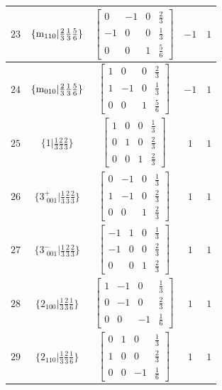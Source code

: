\documentclass[fleqn,8pt]{jsarticle}
\begin{document}
\begin{longtable}{ccccc}
$ 23 $ & $ \{{\rm m}_{110}|\frac{2}{3} \frac{1}{3} \frac{5}{6}\} $ & $ \begin{bmatrix} 0 & -1 & 0 & \frac{2}{3} \\ -1 & 0 & 0 & \frac{1}{3} \\ 0 & 0 & 1 & \frac{5}{6} \end{bmatrix} $ & $ -1 $ & $ 1 $ \\ \hline
$ 24 $ & $ \{{\rm m}_{010}|\frac{2}{3} \frac{1}{3} \frac{5}{6}\} $ & $ \begin{bmatrix} 1 & 0 & 0 & \frac{2}{3} \\ 1 & -1 & 0 & \frac{1}{3} \\ 0 & 0 & 1 & \frac{5}{6} \end{bmatrix} $ & $ -1 $ & $ 1 $ \\ \hline
$ 25 $ & $ \{1|\frac{1}{3} \frac{2}{3} \frac{2}{3}\} $ & $ \begin{bmatrix} 1 & 0 & 0 & \frac{1}{3} \\ 0 & 1 & 0 & \frac{2}{3} \\ 0 & 0 & 1 & \frac{2}{3} \end{bmatrix} $ & $ 1 $ & $ 1 $ \\ \hline
$ 26 $ & $ \{3^{+}_{\,\,001}|\frac{1}{3} \frac{2}{3} \frac{2}{3}\} $ & $ \begin{bmatrix} 0 & -1 & 0 & \frac{1}{3} \\ 1 & -1 & 0 & \frac{2}{3} \\ 0 & 0 & 1 & \frac{2}{3} \end{bmatrix} $ & $ 1 $ & $ 1 $ \\ \hline
$ 27 $ & $ \{3^{-}_{\,\,001}|\frac{1}{3} \frac{2}{3} \frac{2}{3}\} $ & $ \begin{bmatrix} -1 & 1 & 0 & \frac{1}{3} \\ -1 & 0 & 0 & \frac{2}{3} \\ 0 & 0 & 1 & \frac{2}{3} \end{bmatrix} $ & $ 1 $ & $ 1 $ \\ \hline
$ 28 $ & $ \{2{}_{100}|\frac{1}{3} \frac{2}{3} \frac{1}{6}\} $ & $ \begin{bmatrix} 1 & -1 & 0 & \frac{1}{3} \\ 0 & -1 & 0 & \frac{2}{3} \\ 0 & 0 & -1 & \frac{1}{6} \end{bmatrix} $ & $ 1 $ & $ 1 $ \\ \hline
$ 29 $ & $ \{2{}_{110}|\frac{1}{3} \frac{2}{3} \frac{1}{6}\} $ & $ \begin{bmatrix} 0 & 1 & 0 & \frac{1}{3} \\ 1 & 0 & 0 & \frac{2}{3} \\ 0 & 0 & -1 & \frac{1}{6} \end{bmatrix} $ & $ 1 $ & $ 1 $ \\ \hline

\end{longtable}
\end{document}

